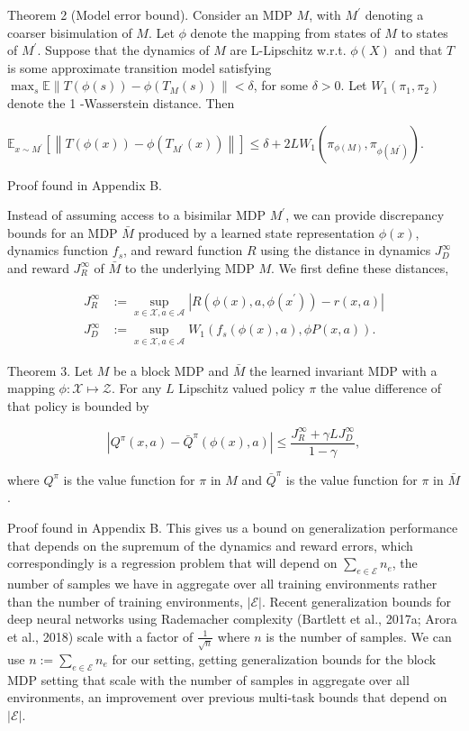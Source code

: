 \documentclass[10pt]{article}
\begin{document}
Theorem 2 (Model error bound). Consider an MDP $M$, with $M^{\prime}$ denoting a coarser bisimulation of $M$. Let $\phi$ denote the mapping from states of $M$ to states of $M^{\prime}$. Suppose that the dynamics of $M$ are L-Lipschitz w.r.t. $\phi(X)$ and that $T$ is some approximate transition model satisfying $\max _{s} \mathbb{E}\left\|T(\phi(s))-\phi\left(T_{M}(s)\right)\right\|<\delta$, for some $\delta>0$. Let $W_{1}\left(\pi_{1}, \pi_{2}\right)$ denote the 1 -Wasserstein distance. Then

$\mathbb{E}_{x \sim M^{\prime}}\left[\left\|T(\phi(x))-\phi\left(T_{M^{\prime}}(x)\right)\right\|\right] \leq \delta+2 L W_{1}\left(\pi_{\phi(M)}, \pi_{\phi\left(M^{\prime}\right)}\right)$.

Proof found in Appendix B.

Instead of assuming access to a bisimilar MDP $M^{\prime}$, we can provide discrepancy bounds for an MDP $\bar{M}$ produced by a learned state representation $\phi(x)$, dynamics function $f_{s}$, and reward function $R$ using the distance in dynamics $J_{D}^{\infty}$ and reward $J_{R}^{\infty}$ of $\bar{M}$ to the underlying MDP $M$. We first define these distances,

\[
\begin{aligned}
J_{R}^{\infty} & :=\sup _{x \in \mathcal{X}, a \in \mathcal{A}}\left|R\left(\phi(x), a, \phi\left(x^{\prime}\right)\right)-r(x, a)\right| \\
J_{D}^{\infty} & :=\sup _{x \in \mathcal{X}, a \in \mathcal{A}} W_{1}\left(f_{s}(\phi(x), a), \phi P(x, a)\right) .
\end{aligned}
\]

Theorem 3. Let $M$ be a block MDP and $\bar{M}$ the learned invariant MDP with a mapping $\phi: \mathcal{X} \mapsto \mathcal{Z}$. For any $L$ Lipschitz valued policy $\pi$ the value difference of that policy is bounded by

\[
\left|Q^{\pi}(x, a)-\bar{Q}^{\pi}(\phi(x), a)\right| \leq \frac{J_{R}^{\infty}+\gamma L J_{D}^{\infty}}{1-\gamma},
\]

where $Q^{\pi}$ is the value function for $\pi$ in $M$ and $\bar{Q}^{\pi}$ is the value function for $\pi$ in $\bar{M}$.

Proof found in Appendix B. This gives us a bound on generalization performance that depends on the supremum of the dynamics and reward errors, which correspondingly is a regression problem that will depend on $\sum_{e \in \mathcal{E}} n_{e}$, the number of samples we have in aggregate over all training environments rather than the number of training environments, $|\mathcal{E}|$. Recent generalization bounds for deep neural networks using Rademacher complexity (Bartlett et al., 2017a; Arora et al., 2018) scale with a factor of $\frac{1}{\sqrt{n}}$ where $n$ is the number of samples. We can use $n:=\sum_{e \in \mathcal{E}} n_{e}$ for our setting, getting generalization bounds for the block MDP setting that scale with the number of samples in aggregate over all environments, an improvement over previous multi-task bounds that depend on $|\mathcal{E}|$.
\end{document}
